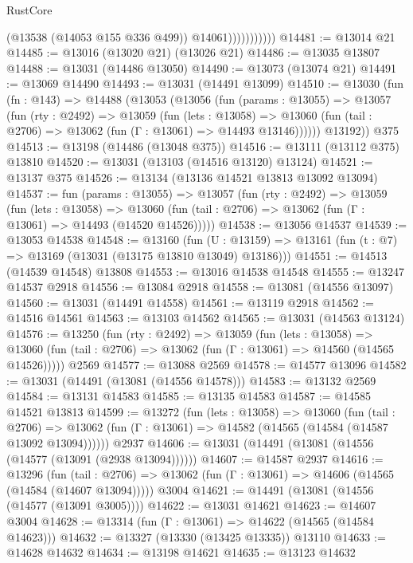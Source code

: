 \begin{lexlean}{RustCore}
\begin{coremodule}
                          (@13538 (@14053 @155 @336 @499))
                          @14061)))))))))))
@14481 := @13014 @21
@14485 := @13016 (@13020 @21) (@13026 @21)
@14486 := @13035 @13807
@14488 := @13031 (@14486 @13050)
@14490 := @13073 (@13074 @21)
@14491 := @13069 @14490
@14493 := @13031 (@14491 @13099)
@14510 := @13030
    (fun (fn : @143) =>
    @14488
      (@13053
        (@13056
          (fun (params : @13055) =>
          @13057
            (fun (rty : @2492) =>
            @13059
              (fun (lets : @13058) =>
              @13060 (fun (tail : @2706) => @13062 (fun (Γ : @13061) => @14493 @13146))))))
        @13192))
    @375
@14513 := @13198 (@14486 (@13048 @375))
@14516 := @13111 (@13112 @375) @13810
@14520 := @13031 (@13103 (@14516 @13120) @13124)
@14521 := @13137 @375
@14526 := @13134 (@13136 @14521 @13813 @13092 @13094)
@14537 := fun (params : @13055) =>
  @13057
    (fun (rty : @2492) =>
    @13059
      (fun (lets : @13058) =>
      @13060 (fun (tail : @2706) => @13062 (fun (Γ : @13061) => @14493 (@14520 @14526)))))
@14538 := @13056 @14537
@14539 := @13053 @14538
@14548 := @13160
    (fun (U : @13159) => @13161 (fun (t : @7) => @13169 (@13031 (@13175 @13810 @13049) @13186)))
@14551 := @14513 (@14539 @14548) @13808
@14553 := @13016 @14538 @14548
@14555 := @13247 @14537 @2918
@14556 := @13084 @2918
@14558 := @13081 (@14556 @13097)
@14560 := @13031 (@14491 @14558)
@14561 := @13119 @2918
@14562 := @14516 @14561
@14563 := @13103 @14562
@14565 := @13031 (@14563 @13124)
@14576 := @13250
    (fun (rty : @2492) =>
    @13059
      (fun (lets : @13058) =>
      @13060 (fun (tail : @2706) => @13062 (fun (Γ : @13061) => @14560 (@14565 @14526)))))
    @2569
@14577 := @13088 @2569
@14578 := @14577 @13096
@14582 := @13031 (@14491 (@13081 (@14556 @14578)))
@14583 := @13132 @2569
@14584 := @13131 @14583
@14585 := @13135 @14583
@14587 := @14585 @14521 @13813
@14599 := @13272
    (fun (lets : @13058) =>
    @13060
      (fun (tail : @2706) =>
      @13062 (fun (Γ : @13061) => @14582 (@14565 (@14584 (@14587 @13092 @13094))))))
    @2937
@14606 := @13031 (@14491 (@13081 (@14556 (@14577 (@13091 (@2938 @13094))))))
@14607 := @14587 @2937
@14616 := @13296
    (fun (tail : @2706) => @13062 (fun (Γ : @13061) => @14606 (@14565 (@14584 (@14607 @13094)))))
    @3004
@14621 := @14491 (@13081 (@14556 (@14577 (@13091 @3005))))
@14622 := @13031 @14621
@14623 := @14607 @3004
@14628 := @13314 (fun (Γ : @13061) => @14622 (@14565 (@14584 @14623)))
@14632 := @13327 (@13330 (@13425 @13335)) @13110
@14633 := @14628 @14632
@14634 := @13198 @14621
@14635 := @13123 @14632

\end{coremodule}
\end{lexlean}
